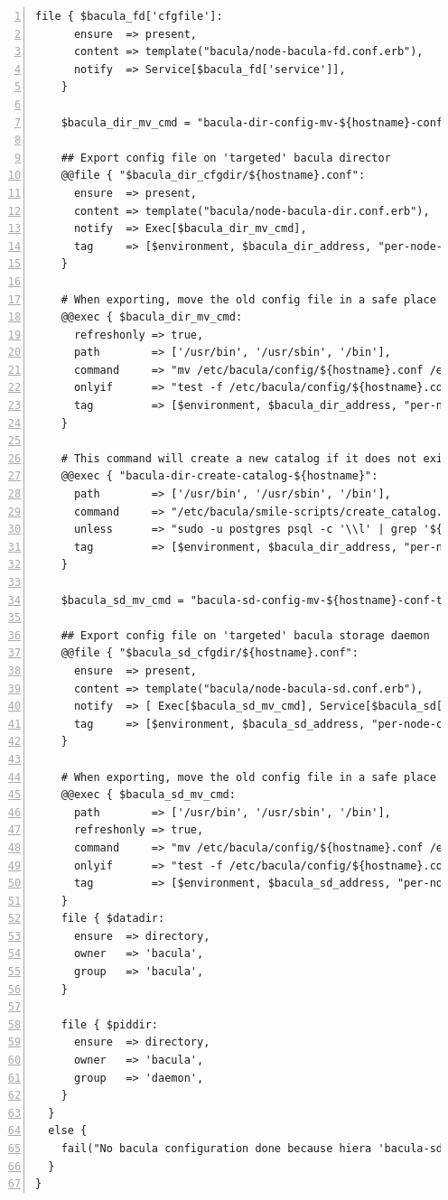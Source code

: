\documentclass[14 pt]{extreport}
\begin{document}
\begin{framed}
\begin{Verbatim}[fontsize=\tiny,numbers=left]
    file { $bacula_fd['cfgfile']:
      ensure  => present,
      content => template("bacula/node-bacula-fd.conf.erb"),
      notify  => Service[$bacula_fd['service']],
    }

    $bacula_dir_mv_cmd = "bacula-dir-config-mv-${hostname}-conf-to-old"

    ## Export config file on 'targeted' bacula director
    @@file { "$bacula_dir_cfgdir/${hostname}.conf":
      ensure  => present,
      content => template("bacula/node-bacula-dir.conf.erb"),
      notify  => Exec[$bacula_dir_mv_cmd],
      tag     => [$environment, $bacula_dir_address, "per-node-config-bacula-dir"],
    }

    # When exporting, move the old config file in a safe place
    @@exec { $bacula_dir_mv_cmd:
      refreshonly => true,
      path        => ['/usr/bin', '/usr/sbin', '/bin'],
      command     => "mv /etc/bacula/config/${hostname}.conf /etc/bacula/config-old/${hostname}.conf",
      onlyif      => "test -f /etc/bacula/config/${hostname}.conf",
      tag         => [$environment, $bacula_dir_address, "per-node-config-bacula-dir"],
    }

    # This command will create a new catalog if it does not exists
    @@exec { "bacula-dir-create-catalog-${hostname}":
      path        => ['/usr/bin', '/usr/sbin', '/bin'],
      command     => "/etc/bacula/smile-scripts/create_catalog.sh ${hostname}",
      unless      => "sudo -u postgres psql -c '\\l' | grep '${hostname}-catalog'",
      tag         => [$environment, $bacula_dir_address, "per-node-config-bacula-dir"],
    }

    $bacula_sd_mv_cmd = "bacula-sd-config-mv-${hostname}-conf-to-old"

    ## Export config file on 'targeted' bacula storage daemon
    @@file { "$bacula_sd_cfgdir/${hostname}.conf":
      ensure  => present,
      content => template("bacula/node-bacula-sd.conf.erb"),
      notify  => [ Exec[$bacula_sd_mv_cmd], Service[$bacula_sd['service']] ],
      tag     => [$environment, $bacula_sd_address, "per-node-config-bacula-sd"],
    }

    # When exporting, move the old config file in a safe place
    @@exec { $bacula_sd_mv_cmd:
      path        => ['/usr/bin', '/usr/sbin', '/bin'],
      refreshonly => true,
      command     => "mv /etc/bacula/config/${hostname}.conf /etc/bacula/config-old/${hostname}.conf",
      onlyif      => "test -f /etc/bacula/config/${hostname}.conf",
      tag         => [$environment, $bacula_sd_address, "per-node-config-bacula-sd"],
    }
    file { $datadir:
      ensure  => directory,
      owner   => 'bacula',
      group   => 'bacula',
    }

    file { $piddir:
      ensure  => directory,
      owner   => 'bacula',
      group   => 'daemon',
    }
  }
  else {
    fail("No bacula configuration done because hiera 'bacula-sd-config' key not found.")
  }
}\end{Verbatim}
\end{framed}
\end{document}
